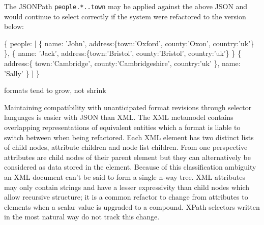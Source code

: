 \documentclass[12pt, ]{article}
\newenvironment{Shaded}{}{}
\newcommand{\DataTypeTok}[1]{\textcolor[rgb]{0.56,0.13,0.00}{{#1}}}
\newcommand{\StringTok}[1]{\textcolor[rgb]{0.25,0.44,0.63}{{#1}}}
\newcommand{\NormalTok}[1]{{#1}}
\begin{document}
The JSONPath \texttt{people.*..town} may be applied against the above
JSON and would continue to select correctly if the system were
refactored to the version below:

\begin{Shaded}
\begin{Highlighting}[]
\NormalTok{\{}
   \DataTypeTok{people}\NormalTok{: [}
      \NormalTok{\{  }\DataTypeTok{name}\NormalTok{: }\StringTok{'John'}\NormalTok{, }
         \DataTypeTok{address}\NormalTok{:\{}\DataTypeTok{town}\NormalTok{:}\StringTok{'Oxford'}\NormalTok{, }\DataTypeTok{county}\NormalTok{:}\StringTok{'Oxon'}\NormalTok{, }\DataTypeTok{country}\NormalTok{:}\StringTok{'uk'}\NormalTok{\}}
      \NormalTok{\},}
      \NormalTok{\{  }\DataTypeTok{name}\NormalTok{: }\StringTok{'Jack'}\NormalTok{,}
         \DataTypeTok{address}\NormalTok{:\{}\DataTypeTok{town}\NormalTok{:}\StringTok{'Bristol'}\NormalTok{, }\DataTypeTok{county}\NormalTok{:}\StringTok{'Bristol'}\NormalTok{, }\DataTypeTok{country}\NormalTok{:}\StringTok{'uk'}\NormalTok{\}}
      \NormalTok{\}}
      \NormalTok{\{  }\DataTypeTok{address}\NormalTok{:\{}
            \DataTypeTok{town}\NormalTok{:}\StringTok{'Cambridge'}\NormalTok{, }\DataTypeTok{county}\NormalTok{:}\StringTok{'Cambridgeshire'}\NormalTok{, }
            \DataTypeTok{country}\NormalTok{:}\StringTok{'uk'}
         \NormalTok{\},}
         \DataTypeTok{name}\NormalTok{: }\StringTok{'Sally'}
      \NormalTok{\}}
   \NormalTok{]}
\NormalTok{\}}
\end{Highlighting}
\end{Shaded}

formats tend to grow, not shrink

Maintaining compatibility with unanticipated format revisions through
selector languages is easier with JSON than XML. The XML metamodel
contains overlapping representations of equivalent entities which a
format is liable to switch between when being refactored. Each XML
element has two distinct lists of child nodes, attribute children and
node list children. From one perspective attributes are child nodes of
their parent element but they can alternatively be considered as data
stored in the element. Because of this classification ambiguity an XML
document can't be said to form a single n-way tree. XML attributes may
only contain strings and have a lesser expressivity than child nodes
which allow recursive structure; it is a common refactor to change from
attributes to elements when a scalar value is upgraded to a compound.
XPath selectors written in the most natural way do not track this
change.
\end{document}
